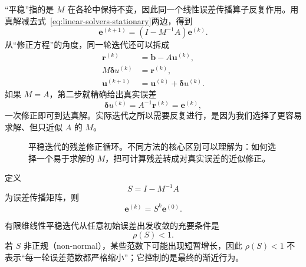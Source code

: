“平稳”指的是 $M$ 在各轮中保持不变，因此同一个线性误差传播算子反复作用。用真解减去式~\eqref{eq:linear-solvers-stationary}两边，得到
\begin{equation}
\bm e^{(k+1)}
=
\left(I-M^{-1}A\right)\bm e^{(k)}.
\end{equation}
从“修正方程”的角度，同一轮迭代还可以拆成
\begin{align}
\bm r^{(k)}
&=\bm b-A\bm u^{(k)},\\
M\bm \delta u^{(k)}
&=\bm r^{(k)},\\
\bm u^{(k+1)}
&=\bm u^{(k)}+\bm\delta u^{(k)}.
\label{eq:linear-solvers-stationary-correction-form}
\end{align}
如果 $M=A$，第二步就精确给出真实误差
\begin{equation}
\bm\delta u^{(k)}
=A^{-1}\bm r^{(k)}
=\bm e^{(k)},
\end{equation}
一次修正即可到达真解。实际迭代之所以需要反复进行，是因为我们选择了更容易求解、但只近似 $A$ 的 $M$。

\begin{figure}[htbp]
\centering
{}
\caption{平稳迭代的残差修正循环。不同方法的核心区别可以理解为：如何选择一个易于求解的 $M$，把可计算残差转成对真实误差的近似修正。}
\label{fig:linear-solvers-stationary-correction}
\end{figure}

定义
\begin{equation}
S
=
I-M^{-1}A
\label{eq:linear-solvers-error-propagation}
\end{equation}
为误差传播矩阵，则
\begin{equation}
\bm e^{(k)}=S^k\bm e^{(0)}.
\end{equation}

有限维线性平稳迭代从任意初始误差出发收敛的充要条件是
\begin{equation}
\boxed{
\rho(S)<1.
}
\label{eq:linear-solvers-stationary-convergence}
\end{equation}
若 $S$ 非正规（non-normal），某些范数下可能出现短暂增长，因此 $\rho(S)<1$ 不表示“每一轮误差范数都严格缩小”；它控制的是最终的渐近行为。

